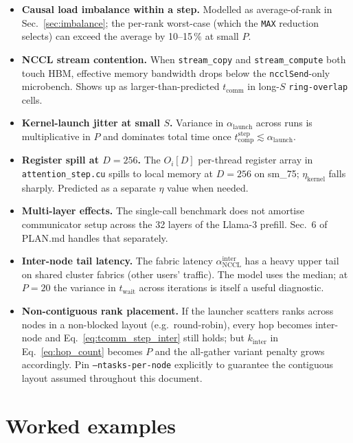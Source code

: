 \documentclass[11pt]{article}
\newcommand{\comp}{\mathrm{comp}}
\newcommand{\comm}{\mathrm{comm}}
\newcommand{\wait}{\mathrm{wait}}
\newcommand{\step}{\mathrm{step}}
\begin{document}
\begin{itemize}
  \item \textbf{Causal load imbalance within a step.} Modelled as
        average-of-rank in Sec.~\ref{sec:imbalance}; the per-rank
        worst-case (which the \texttt{MAX} reduction selects)
        can exceed the average by 10--15\,\% at small $P$.
  \item \textbf{NCCL stream contention.} When \texttt{stream\_copy}
        and \texttt{stream\_compute} both touch HBM, effective
        memory bandwidth drops below the \texttt{ncclSend}-only
        microbench. Shows up as larger-than-predicted $t_\comm$
        in long-$S$ \texttt{ring-overlap} cells.
  \item \textbf{Kernel-launch jitter at small $S$.} Variance in
        $\alpha_{\text{launch}}$ across runs is multiplicative in
        $P$ and dominates total time once $t_\comp^\step \lesssim
        \alpha_{\text{launch}}$.
  \item \textbf{Register spill at $D = 256$.} The
        $O_i[D]$ per-thread register array in
        \texttt{attention\_step.cu} spills to local memory at
        $D=256$ on sm\_75; $\eta_{\text{kernel}}$ falls sharply.
        Predicted as a separate $\eta$ value when needed.
  \item \textbf{Multi-layer effects.} The single-call benchmark
        does not amortise communicator setup across the
        32 layers of the Llama-3 prefill. Sec.~6 of PLAN.md handles
        that separately.
  \item \textbf{Inter-node tail latency.} The fabric latency
        $\alpha_{\text{NCCL}}^{\text{inter}}$ has a heavy upper tail
        on shared cluster fabrics (other users' traffic). The model
        uses the median; at $P = 20$ the variance in $t_\wait$ across
        iterations is itself a useful diagnostic.
  \item \textbf{Non-contiguous rank placement.} If the launcher
        scatters ranks across nodes in a non-blocked layout
        (e.g.~round-robin), every hop becomes inter-node and
        Eq.~\eqref{eq:tcomm_step_inter} still holds; but
        $k_\text{inter}$ in Eq.~\eqref{eq:hop_count} becomes $P$ and
        the all-gather variant penalty grows accordingly. Pin
        \texttt{--ntasks-per-node} explicitly to guarantee the
        contiguous layout assumed throughout this document.
\end{itemize}

\section{Worked examples}
\label{sec:example}
\end{document}
